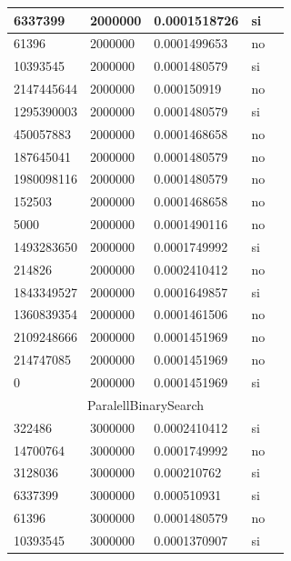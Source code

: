 \documentclass[12pt, fleqn]{article}                             %
\theoremstyle{break}                                            %
\begin{document}
\begin{longtable}{|m{5em}|m{5em}|m{10em}|m{5em}|@{}m{0pt}@{}}
            6337399& 2000000  & 0.0001518726 & si &\\[1em]    \hline
            61396& 2000000  & 0.0001499653 & no &\\[1em]    \hline
            10393545& 2000000  & 0.0001480579 & si &\\[1em]    \hline
            2147445644& 2000000  & 0.000150919 & no &\\[1em]    \hline
            1295390003& 2000000  & 0.0001480579 & si &\\[1em]    \hline
            450057883& 2000000  & 0.0001468658 & no &\\[1em]    \hline
            187645041& 2000000  & 0.0001480579 & no &\\[1em]    \hline
            1980098116& 2000000  & 0.0001480579 & no &\\[1em]    \hline
            152503& 2000000  & 0.0001468658 & no &\\[1em]    \hline
            5000& 2000000  & 0.0001490116 & no &\\[1em]    \hline
            1493283650& 2000000  & 0.0001749992 & si &\\[1em]    \hline
            214826& 2000000  & 0.0002410412 & no &\\[1em]    \hline
            1843349527& 2000000  & 0.0001649857 & si &\\[1em]    \hline
            1360839354& 2000000  & 0.0001461506 & no &\\[1em]    \hline
            2109248666& 2000000  & 0.0001451969 & no &\\[1em]    \hline
            214747085& 2000000  & 0.0001451969 & no &\\[1em]    \hline
            0& 2000000  & 0.0001451969 & si &\\[1em]    \hline
            \multicolumn{5}{|c|}{ParalellBinarySearch}   \\          \hline
            322486& 3000000  & 0.0002410412 & si &\\[1em]    \hline
            14700764& 3000000  & 0.0001749992 & no &\\[1em]    \hline
            3128036& 3000000  & 0.000210762 & si &\\[1em]    \hline
            6337399& 3000000  & 0.000510931 & si &\\[1em]    \hline
            61396& 3000000  & 0.0001480579 & no &\\[1em]    \hline
            10393545& 3000000  & 0.0001370907 & si &\\[1em]    \hline

\end{longtable}
\end{document}

